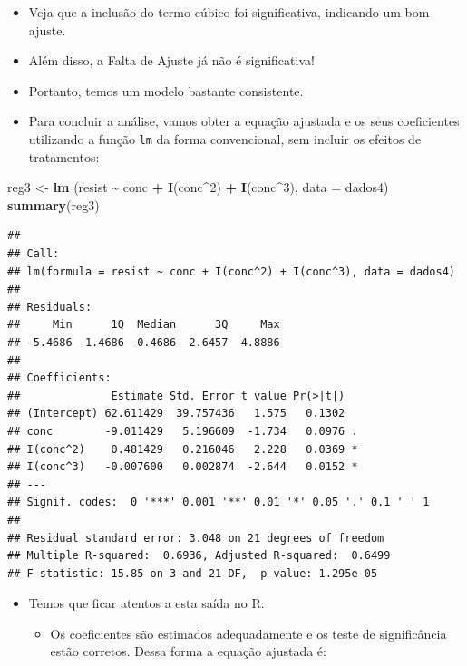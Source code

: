 \documentclass[
]{book}
\newenvironment{Shaded}{\begin{snugshade}}{\end{snugshade}}
\newcommand{\AttributeTok}[1]{\textcolor[rgb]{0.13,0.29,0.53}{#1}}
\newcommand{\DecValTok}[1]{\textcolor[rgb]{0.00,0.00,0.81}{#1}}
\newcommand{\FunctionTok}[1]{\textcolor[rgb]{0.13,0.29,0.53}{\textbf{#1}}}
\newcommand{\NormalTok}[1]{#1}
\newcommand{\OtherTok}[1]{\textcolor[rgb]{0.56,0.35,0.01}{#1}}
\newcommand{\SpecialCharTok}[1]{\textcolor[rgb]{0.81,0.36,0.00}{\textbf{#1}}}
\providecommand{\tightlist}{%
  \setlength{\itemsep}{0pt}\setlength{\parskip}{0pt}}
\begin{document}
\begin{itemize}
\item
  Veja que a inclusão do termo cúbico foi significativa, indicando um bom ajuste.
\item
  Além disso, a Falta de Ajuste já não é significativa!
\item
  Portanto, temos um modelo bastante consistente.
\item
  Para concluir a análise, vamos obter a equação ajustada e os seus coeficientes utilizando a função \texttt{lm} da forma convencional, sem incluir os efeitos de tratamentos:
\end{itemize}

\begin{Shaded}
\begin{Highlighting}[]
\NormalTok{reg3 }\OtherTok{\textless{}{-}} \FunctionTok{lm}\NormalTok{ (resist }\SpecialCharTok{\textasciitilde{}}\NormalTok{ conc }\SpecialCharTok{+} \FunctionTok{I}\NormalTok{(conc}\SpecialCharTok{\^{}}\DecValTok{2}\NormalTok{) }\SpecialCharTok{+} \FunctionTok{I}\NormalTok{(conc}\SpecialCharTok{\^{}}\DecValTok{3}\NormalTok{), }\AttributeTok{data =}\NormalTok{ dados4)}
\FunctionTok{summary}\NormalTok{(reg3)}
\end{Highlighting}
\end{Shaded}

\begin{verbatim}
## 
## Call:
## lm(formula = resist ~ conc + I(conc^2) + I(conc^3), data = dados4)
## 
## Residuals:
##     Min      1Q  Median      3Q     Max 
## -5.4686 -1.4686 -0.4686  2.6457  4.8886 
## 
## Coefficients:
##              Estimate Std. Error t value Pr(>|t|)  
## (Intercept) 62.611429  39.757436   1.575   0.1302  
## conc        -9.011429   5.196609  -1.734   0.0976 .
## I(conc^2)    0.481429   0.216046   2.228   0.0369 *
## I(conc^3)   -0.007600   0.002874  -2.644   0.0152 *
## ---
## Signif. codes:  0 '***' 0.001 '**' 0.01 '*' 0.05 '.' 0.1 ' ' 1
## 
## Residual standard error: 3.048 on 21 degrees of freedom
## Multiple R-squared:  0.6936, Adjusted R-squared:  0.6499 
## F-statistic: 15.85 on 3 and 21 DF,  p-value: 1.295e-05
\end{verbatim}

\begin{itemize}
\tightlist
\item
  Temos que ficar atentos a esta saída no R:

  \begin{itemize}
  \tightlist
  \item
    Os coeficientes são estimados adequadamente e os teste de significância estão corretos. Dessa forma a equação ajustada é:
  \end{itemize}
\end{itemize}
\end{document}
